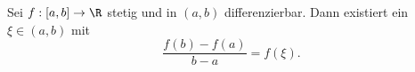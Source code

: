 Sei $f: [a, b] \to \R$ stetig und in $(a, b)$ differenzierbar. Dann existiert ein $\xi \in (a, b)$ mit
$$\frac{f(b)-f(a)}{b-a} = f(\xi).$$